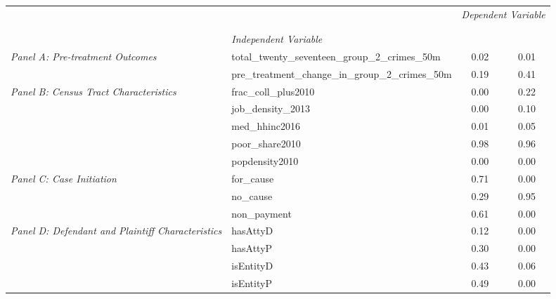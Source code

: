 \begin{tabular}{llcc}
\toprule
 &  & \multicolumn{2}{c}{\textit{Dependent Variable}} \\
\cline{3-4}
\\
 &  &  &  \\
 & \emph{Independent Variable} &  &  \\
\midrule
\multirow[c]{2}{3cm}{\textit{Panel A: Pre-treatment Outcomes}} & total_twenty_seventeen_group_2_crimes_50m & 0.02 & 0.01 \\
 & pre_treatment_change_in_group_2_crimes_50m & 0.19 & 0.41 \\
\cline{1-4}
\multirow[c]{5}{3cm}{\textit{Panel B: Census Tract Characteristics}} & frac_coll_plus2010 & 0.00 & 0.22 \\
 & job_density_2013 & 0.00 & 0.10 \\
 & med_hhinc2016 & 0.01 & 0.05 \\
 & poor_share2010 & 0.98 & 0.96 \\
 & popdensity2010 & 0.00 & 0.00 \\
\cline{1-4}
\multirow[c]{3}{3cm}{\textit{Panel C: Case Initiation}} & for_cause & 0.71 & 0.00 \\
 & no_cause & 0.29 & 0.95 \\
 & non_payment & 0.61 & 0.00 \\
\cline{1-4}
\multirow[c]{4}{3cm}{\textit{Panel D: Defendant and Plaintiff Characteristics}} & hasAttyD & 0.12 & 0.00 \\
 & hasAttyP & 0.30 & 0.00 \\
 & isEntityD & 0.43 & 0.06 \\
 & isEntityP & 0.49 & 0.00 \\
\cline{1-4}
\bottomrule
\end{tabular}
